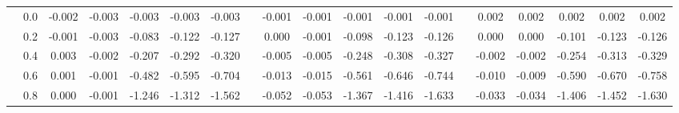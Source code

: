 \begin{table}
{\begin{tabular}{llccccccccccccccccc}
 & 0.0 & \cellcolor[HTML]{79B1D3}-0.002 & \cellcolor[HTML]{79B1D3}-0.003 & \cellcolor[HTML]{79B1D3}-0.003 & \cellcolor[HTML]{79B1D3}-0.003 & \cellcolor[HTML]{79B1D3}-0.003 & & \cellcolor[HTML]{76AFD2}-0.001 & \cellcolor[HTML]{76AED2}-0.001 & \cellcolor[HTML]{76AFD2}-0.001 & \cellcolor[HTML]{76AFD2}-0.001 & \cellcolor[HTML]{77AFD2}-0.001 & & \cellcolor[HTML]{78B0D3}0.002 & \cellcolor[HTML]{78B0D3}0.002 & \cellcolor[HTML]{78B0D3}0.002 & \cellcolor[HTML]{78B0D3}0.002 & \cellcolor[HTML]{77AFD2}0.002 \\
 & 0.2 & \cellcolor[HTML]{77AFD2}-0.001 & \cellcolor[HTML]{7AB1D3}-0.003 & \cellcolor[HTML]{CDEAF3}-0.083 & \cellcolor[HTML]{E1F3F7}-0.122 & \cellcolor[HTML]{E2F4F4}-0.127 & & \cellcolor[HTML]{74ADD1}0.000 & \cellcolor[HTML]{76AFD2}-0.001 & \cellcolor[HTML]{D4EDF4}-0.098 & \cellcolor[HTML]{DFF3F8}-0.123 & \cellcolor[HTML]{E0F3F8}-0.126 & & \cellcolor[HTML]{75ADD1}0.000 & \cellcolor[HTML]{74ADD1}0.000 & \cellcolor[HTML]{D5EEF5}-0.101 & \cellcolor[HTML]{DFF3F8}-0.123 & \cellcolor[HTML]{E0F3F8}-0.126 \\
 & 0.4 & \cellcolor[HTML]{79B1D3}0.003 & \cellcolor[HTML]{79B0D3}-0.002 & \cellcolor[HTML]{F4FAD7}-0.207 & \cellcolor[HTML]{FEFFC1}-0.292 & \cellcolor[HTML]{FFFDBB}-0.320 & & \cellcolor[HTML]{7EB5D5}-0.005 & \cellcolor[HTML]{7EB5D5}-0.005 & \cellcolor[HTML]{F8FCCE}-0.248 & \cellcolor[HTML]{FFFFC0}-0.308 & \cellcolor[HTML]{FFFDBD}-0.327 & & \cellcolor[HTML]{78B0D3}-0.002 & \cellcolor[HTML]{79B0D3}-0.002 & \cellcolor[HTML]{F9FCCD}-0.254 & \cellcolor[HTML]{FFFFBF}-0.313 & \cellcolor[HTML]{FFFDBC}-0.329 \\
 & 0.6 & \cellcolor[HTML]{77AFD2}0.001 & \cellcolor[HTML]{75AED1}-0.001 & \cellcolor[HTML]{FFEEA5}-0.482 & \cellcolor[HTML]{FFE699}-0.595 & \cellcolor[HTML]{FEDF8F}-0.704 & & \cellcolor[HTML]{8BBFDB}-0.013 & \cellcolor[HTML]{8EC1DC}-0.015 & \cellcolor[HTML]{FFEA9F}-0.561 & \cellcolor[HTML]{FEE497}-0.646 & \cellcolor[HTML]{FEDF8F}-0.744 & & \cellcolor[HTML]{87BBD9}-0.010 & \cellcolor[HTML]{85BAD8}-0.009 & \cellcolor[HTML]{FFE89C}-0.590 & \cellcolor[HTML]{FEE394}-0.670 & \cellcolor[HTML]{FEDD8D}-0.758 \\
 & 0.8 & \cellcolor[HTML]{74ADD1}0.000 & \cellcolor[HTML]{77AFD2}-0.001 & \cellcolor[HTML]{FEBC6E}-1.246 & \cellcolor[HTML]{FEB96B}-1.312 & \cellcolor[HTML]{FDAE61}-1.562 & & \cellcolor[HTML]{B7DFEC}-0.052 & \cellcolor[HTML]{B7DFEC}-0.053 & \cellcolor[HTML]{FEB96B}-1.367 & \cellcolor[HTML]{FEB769}-1.416 & \cellcolor[HTML]{FDAE61}-1.633 & & \cellcolor[HTML]{A5D4E6}-0.033 & \cellcolor[HTML]{A6D5E7}-0.034 & \cellcolor[HTML]{FEB76A}-1.406 & \cellcolor[HTML]{FEB568}-1.452 & \cellcolor[HTML]{FDAE61}-1.630 \\

\end{tabular}}
\end{table}
